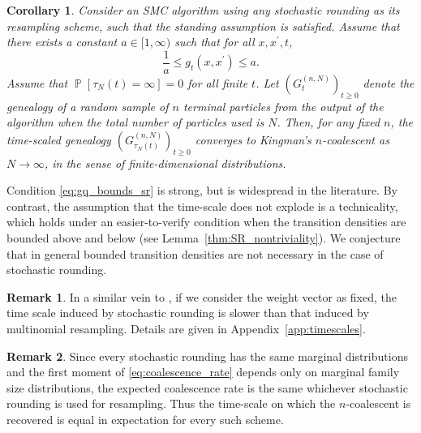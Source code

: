\documentclass{article} %
\newtheorem{corollary}{Corollary}
\theoremstyle{definition}
\newtheorem{remark}{Remark}
\DeclareMathOperator{\Prob}{\mathbb{P}}
\newcommand{\1}[1]{\mathbbm{1}_{\{#1\}}}
\begin{document}
\begin{corollary}\label{thm:stochrounding}
Consider an SMC algorithm using any stochastic rounding as its resampling scheme, such that the standing assumption is satisfied.
Assume that there exists a constant $a\in [1,\infty)$ such that for all $x, x^\prime, t$,
\begin{equation}\label{eq:gq_bounds_sr}
\frac{1}{a} \leq g_t(x, x^\prime) \leq a . %
\end{equation}
Assume that $\Prob[ \tau_N(t) = \infty] =0$ for all finite $t$.
Let $(G_t^{(n,N)})_{t\geq0}$ denote the genealogy of a random sample of $n$ terminal particles from the output of the algorithm when the total number of particles used is $N$. Then, for any fixed $n$, the time-scaled genealogy $(G_{\tau_N(t)}^{(n,N)})_{t\geq0}$ converges to Kingman's $n$-coalescent as $N\to \infty$, in the sense of finite-dimensional distributions.
\end{corollary}

Condition \eqref{eq:gq_bounds_sr} is strong, but is widespread in the literature.
By contrast, the assumption that the time-scale does not explode is a technicality, which holds under an easier-to-verify condition when the transition densities are bounded above and below (see Lemma~\ref{thm:SR_nontriviality}). We conjecture that in general bounded transition densities are not necessary in the case of stochastic rounding.

\begin{remark}
In a similar vein to \cite[Remark 3]{koskela2018}, if we consider the weight vector as fixed, the time scale induced by stochastic rounding is slower than that induced by multinomial resampling. Details are given in Appendix~\ref{app:timescales}.
\end{remark}

\begin{remark}
Since every stochastic rounding has the same marginal distributions and the first moment of \eqref{eq:coalescence_rate} depends only on marginal family size distributions, the expected coalescence rate is the same whichever stochastic rounding is used for resampling. Thus the time-scale on which the $n$-coalescent is recovered is equal in expectation for every such scheme.
\end{remark}
\end{document}
